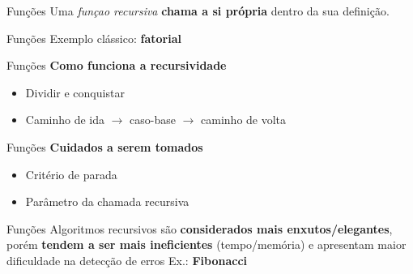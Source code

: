 \documentclass[10pt]{beamer}
\begin{document}
\begin{frame}{Funções}
  \huge
  Uma \textit{funçao recursiva} \textbf{chama a si própria} dentro da sua definição.
\end{frame}

\begin{frame}{Funções}
  \Huge
  Exemplo clássico: \textbf{fatorial}
\end{frame}

\begin{frame}{Funções}
  \huge
  \textbf{Como funciona a recursividade}
  \vfill
  \LARGE
  \begin{itemize}
    \item Dividir e conquistar
    \item Caminho de ida $\rightarrow$ caso-base $\rightarrow$ caminho de volta
  \end{itemize}

\end{frame}

\begin{frame}{Funções}
  \huge
  \textbf{Cuidados a serem tomados}
  \vfill
  \LARGE
  \begin{itemize}
    \item Critério de parada
    \item Parâmetro da chamada recursiva
  \end{itemize}
\end{frame}

\begin{frame}{Funções}
  \LARGE
  Algoritmos recursivos são \textbf{considerados mais enxutos/elegantes}, porém \textbf{tendem a ser mais ineficientes} (tempo/memória) e apresentam maior dificuldade na detecção de erros
  \vfill
  Ex.: \textbf{Fibonacci}
\end{frame}
\end{document}
